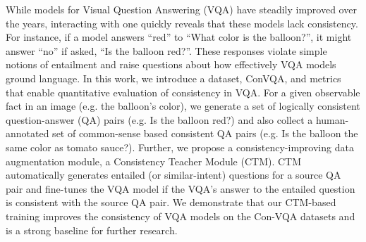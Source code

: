 While models for Visual Question Answering (VQA) have steadily improved over the years, interacting with one quickly reveals that these models lack consistency. For instance, if a model answers “red” to “What color is the balloon?”, it might answer “no” if asked, “Is the balloon red?”. These responses violate simple notions of entailment and raise questions about how effectively VQA models ground language. In this work, we introduce a dataset, ConVQA, and metrics that enable quantitative evaluation of consistency in VQA. For a given observable fact in an image (e.g. the balloon’s color),  we generate a set of logically consistent question-answer (QA) pairs (e.g. Is the  balloon red?)   and  also  collect  a  human-annotated set of common-sense based consistent  QA  pairs  (e.g.  Is  the  balloon  the  same color  as  tomato  sauce?). Further, we propose a consistency-improving data augmentation module, a Consistency Teacher Module (CTM). CTM automatically generates entailed (or similar-intent) questions for a source QA pair and fine-tunes the VQA model if the VQA’s answer to the entailed question is consistent with the source QA pair. We demonstrate that our CTM-based training improves the consistency of VQA models on the Con-VQA datasets and is a strong baseline for further research.